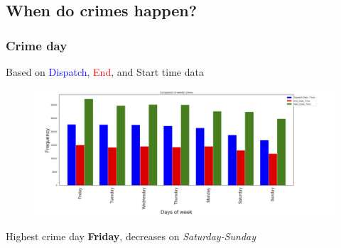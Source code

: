 \documentclass[usenames,dvipsnames]{beamer}
\begin{document}
\subsection{When do crimes happen?}
\begin{frame}
\frametitle{Crime day}
\vspace{-0.5cm}
Based on  \textcolor{blue}{Dispatch},  \textcolor{red}{End}, and  \textcolor{OliveGreen}{Start} time data  \\ 
\graphicspath{{Figures//}}
\begin{figure}[htbp]
\centering
\includegraphics[width= 4.0 in]{crime_day}
\label{crimeday}
\end{figure}
Highest crime day  \textbf{Friday}, decreases on  \emph{Saturday-Sunday}  
\end{frame}
\end{document}
